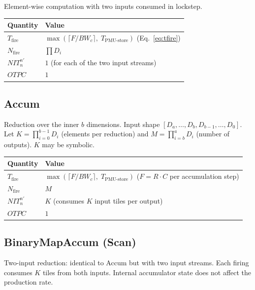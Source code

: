 \documentclass[10pt]{article}
\begin{document}
Element-wise computation with two inputs consumed in lockstep.

\begin{table}[h]
\centering
\begin{tabular}{@{}ll@{}}
\toprule
\textbf{Quantity} & \textbf{Value} \\
\midrule
$T_{\text{fire}}$ & $\max\!\left(\lceil F / \mathit{BW}_c\rceil,\; T_{\text{PMU-store}}\right)$ \quad (Eq.~\ref{eq:tfire}) \\[4pt]
$N_{\text{fire}}$ & $\prod D_i$ \\
$\mathit{NIT}^{n'}_n$ & $1$ \quad (for each of the two input streams) \\
$\mathit{OTPC}$ & $1$ \\
\bottomrule
\end{tabular}
\end{table}

\subsection{Accum}

Reduction over the inner $b$ dimensions. Input shape $[D_a, \ldots, D_b, D_{b-1}, \ldots, D_0]$. Let $K = \prod_{i=0}^{b-1} D_i$ (elements per reduction) and $M = \prod_{i=b}^{a} D_i$ (number of outputs). $K$ may be symbolic.

\begin{table}[h]
\centering
\begin{tabular}{@{}ll@{}}
\toprule
\textbf{Quantity} & \textbf{Value} \\
\midrule
$T_{\text{fire}}$ & $\max\!\left(\lceil F / \mathit{BW}_c\rceil,\; T_{\text{PMU-store}}\right)$ \quad ($F = R \cdot C$ per accumulation step) \\[4pt]
$N_{\text{fire}}$ & $M$ \\
$\mathit{NIT}^{n'}_n$ & $K$ \quad (consumes $K$ input tiles per output) \\
$\mathit{OTPC}$ & $1$ \\
\bottomrule
\end{tabular}
\end{table}

\subsection{BinaryMapAccum (Scan)}

Two-input reduction: identical to Accum but with two input streams. Each firing consumes $K$ tiles from both inputs. Internal accumulator state does not affect the production rate.
\end{document}
